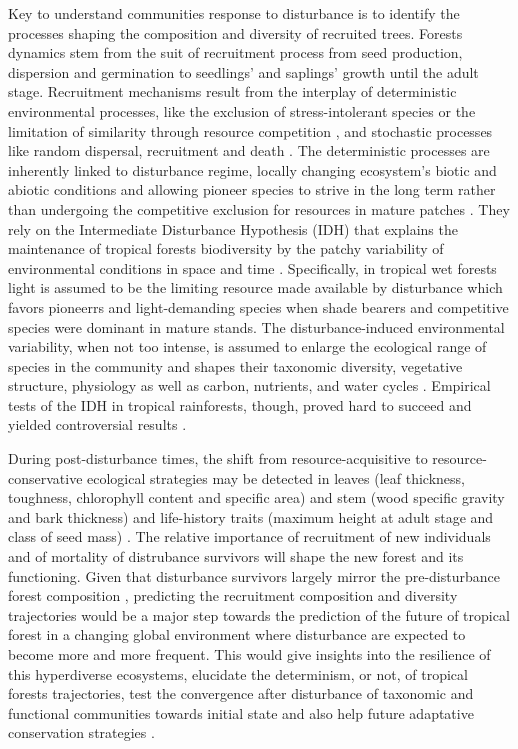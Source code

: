 \documentclass[fleqn,10pt]{ArtEcoFoG} %
\begin{document}
Key to understand communities response to disturbance is to identify the
processes shaping the composition and diversity of recruited trees.
Forests dynamics stem from the suit of recruitment process from seed
production, dispersion and germination to seedlings' and saplings'
growth until the adult stage. Recruitment mechanisms result from the
interplay of deterministic environmental processes, like the exclusion
of stress-intolerant species or the limitation of similarity through
resource competition \citep{Ackerly2003, McGill2006}, and stochastic
processes like random dispersal, recruitment and death
\citep{Hubbell2001}. The deterministic processes are inherently linked
to disturbance regime, locally changing ecosystem's biotic and abiotic
conditions and allowing pioneer species to strive in the long term
rather than undergoing the competitive exclusion for resources in mature
patches \citep{Denslow1980}. They rely on the Intermediate Disturbance
Hypothesis (IDH) that explains the maintenance of tropical forests
biodiversity by the patchy variability of environmental conditions in
space and time \citep{Guitet2018}. Specifically, in tropical wet forests
light is assumed to be the limiting resource made available by
disturbance which favors pioneerrs and light-demanding species when
shade bearers and competitive species were dominant in mature stands.
The disturbance-induced environmental variability, when not too intense,
is assumed to enlarge the ecological range of species in the community
\citep{Molino2001, Bongers2009} and shapes their taxonomic diversity,
vegetative structure, physiology as well as carbon, nutrients, and water
cycles \citep{Anderson-Teixeira2013}. Empirical tests of the IDH in
tropical rainforests, though, proved hard to succeed and yielded
controversial results \citep{Hubbell1999, Molino2001, Sheil2003}.

During post-disturbance times, the shift from resource-acquisitive to
resource-conservative ecological strategies may be detected in leaves
(leaf thickness, toughness, chlorophyll content and specific area) and
stem (wood specific gravity and bark thickness) and life-history traits
(maximum height at adult stage and class of seed mass)
\citep{Wright2004, Chave2009b, Herault2011}. The relative importance of
recruitment of new individuals and of mortality of distrubance survivors
will shape the new forest and its functioning. Given that disturbance
survivors largely mirror the pre-disturbance forest composition
\citep{Piponiot2018}, predicting the recruitment composition and
diversity trajectories would be a major step towards the prediction of
the future of tropical forest in a changing global environment where
disturbance are expected to become more and more frequent. This would
give insights into the resilience of this hyperdiverse ecosystems,
elucidate the determinism, or not, of tropical forests trajectories,
test the convergence after disturbance of taxonomic and functional
communities towards initial state and also help future adaptative
conservation strategies \citep{Diaz2005, Gardner2007, Schwartz2017}.
\end{document}

